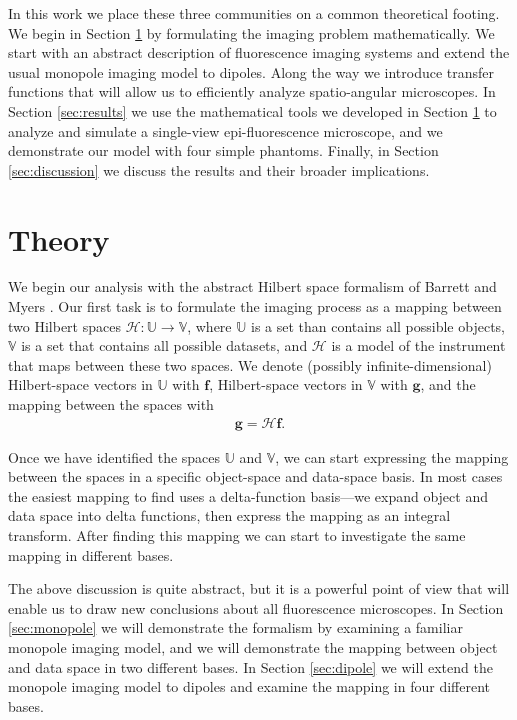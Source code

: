 \documentclass[]{osa-article}
\providecommand{\mb}[1]{\mathbf{#1}}
\providecommand{\mc}[1]{\mathcal{#1}}
\providecommand{\mbb}[1]{\mathbb{#1}}
\begin{document}
In this work we place these three communities on a common theoretical footing.
We begin in Section \ref{sec:theory} by formulating the imaging problem
mathematically. We start with an abstract description of fluorescence imaging
systems and extend the usual monopole imaging model to dipoles. Along the way we
introduce transfer functions that will allow us to efficiently analyze
spatio-angular microscopes. In Section \ref{sec:results} we use the mathematical
tools we developed in Section \ref{sec:theory} to analyze and simulate a
single-view epi-fluorescence microscope, and we demonstrate our model with four
simple phantoms. Finally, in Section \ref{sec:discussion} we discuss the results
and their broader implications.

\section{Theory}\label{sec:theory}
We begin our analysis with the abstract Hilbert space formalism of Barrett and
Myers \cite{barrett2004}. Our first task is to formulate the imaging process as
a mapping between two Hilbert spaces $\mc{H}: \mbb{U} \rightarrow \mbb{V}$, where
$\mbb{U}$ is a set than contains all possible objects, $\mbb{V}$ is a set that
contains all possible datasets, and $\mc{H}$ is a model of the instrument that
maps between these two spaces. We denote (possibly infinite-dimensional)
Hilbert-space vectors in $\mbb{U}$ with $\mb{f}$, Hilbert-space vectors in
$\mbb{V}$ with $\mb{g}$, and the mapping between the spaces with
\begin{align}
  \mb{g} = \mc{H}\mb{f}.
\end{align}

Once we have identified the spaces $\mbb{U}$ and $\mbb{V}$, we can start
expressing the mapping between the spaces in a specific object-space and
data-space basis. In most cases the easiest mapping to find uses a
delta-function basis---we expand object and data space into delta functions,
then express the mapping as an integral transform. After finding this mapping we
can start to investigate the same mapping in different bases.

The above discussion is quite abstract, but it is a powerful point of view that
will enable us to draw new conclusions about all fluorescence microscopes. In
Section \ref{sec:monopole} we will demonstrate the formalism by examining a
familiar monopole imaging model, and we will demonstrate the mapping between
object and data space in two different bases. In Section \ref{sec:dipole} we
will extend the monopole imaging model to dipoles and examine the mapping in
four different bases.
\end{document}
